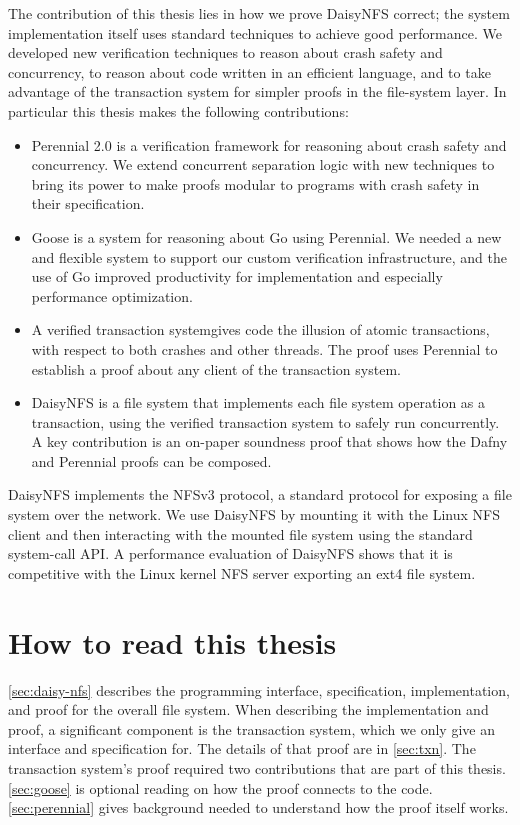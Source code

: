 The contribution of this thesis lies in how we prove DaisyNFS correct; the
system implementation itself uses standard techniques to achieve good
performance. We developed new verification techniques to reason about crash
safety and concurrency, to reason about code written in an efficient language,
and to take advantage of the transaction system for simpler proofs in the
file-system layer. In particular this thesis makes the following contributions:
\begin{itemize}
  \item Perennial 2.0 is a verification framework for reasoning about crash
  safety and concurrency. We extend concurrent separation logic with new
  techniques to bring its power to make proofs modular to programs with crash
  safety in their specification.
  \item Goose is a system for reasoning about Go using Perennial. We needed a
  new and flexible system to support our custom verification infrastructure, and
  the use of Go improved productivity for implementation and especially
  performance optimization.
  \item A verified transaction systemgives code the
  illusion of atomic transactions, with respect to both crashes and other
  threads. The proof uses Perennial to establish a proof about any client of the
  transaction system.
  \item DaisyNFS is a file system that implements each file system operation as
  a transaction, using the verified transaction system to safely run
  concurrently. A key contribution is an on-paper soundness proof that shows how
  the Dafny and Perennial proofs can be composed.
\end{itemize}

DaisyNFS implements the NFSv3 protocol, a standard protocol for exposing
a file system over the network. We use DaisyNFS by mounting it with the
Linux NFS client and then interacting with the mounted file system using
the standard system-call API. A performance evaluation of DaisyNFS shows
that it is competitive with the Linux kernel NFS server exporting an
ext4 file system.

\section{How to read this thesis}

\autoref{sec:daisy-nfs} describes the programming interface, specification,
implementation, and proof for the overall file system. When describing the
implementation and proof, a significant component is the transaction system,
which we only give an interface and specification for. The details of that proof
are in \autoref{sec:txn}. The transaction system's proof required two
contributions that are part of this thesis. \autoref{sec:goose} is optional
reading on how the proof connects to the code. \autoref{sec:perennial} gives
background needed to understand how the proof itself works.
